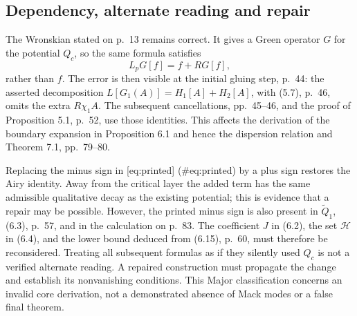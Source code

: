 \documentclass[10pt]{article}
\begin{document}
\subsection*{Dependency, alternate reading and repair}
The Wronskian stated on p. 13 remains correct. It gives a Green operator \(G\) for the potential \(Q_c\), so the same formula satisfies \[L_pG[f]=f+RG[f],\] rather than \(f\). The error is then visible at the initial gluing step, p. 44: the asserted decomposition \(L[G_1(A)]=H_1[A]+H_2[A]\), with (5.7), p. 46, omits the extra \(R\chi_1 A\). The subsequent cancellations, pp. 45–46, and the proof of Proposition 5.1, p. 52, use those identities. This affects the derivation of the boundary expansion in Proposition 6.1 and hence the dispersion relation and Theorem 7.1, pp. 79–80.\par
Replacing the minus sign in [eq:printed] (\#eq:printed) by a plus sign restores the Airy identity. Away from the critical layer the added term has the same admissible qualitative decay as the existing potential; this is evidence that a repair may be possible. However, the printed minus sign is also present in \(\widetilde Q_1\), (6.3), p. 57, and in the calculation on p. 83. The coefficient \(J\) in (6.2), the set \(\mathcal H\) in (6.4), and the lower bound deduced from (6.15), p. 60, must therefore be reconsidered. Treating all subsequent formulas as if they silently used \(Q_c\) is not a verified alternate reading. A repaired construction must propagate the change and establish its nonvanishing conditions. This Major classification concerns an invalid core derivation, not a demonstrated absence of Mack modes or a false final theorem.\par
\end{document}
